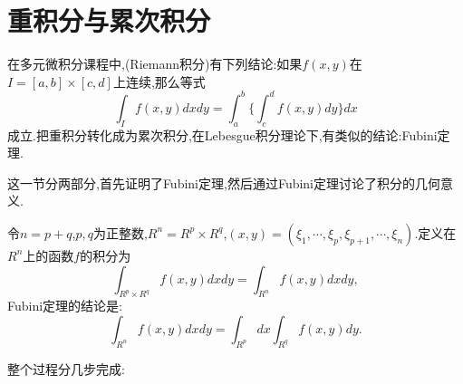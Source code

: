 \documentclass[12pt,a4paper,openany]{book}
\begin{document}
\section{重积分与累次积分}
在多元微积分课程中,(Riemann积分)有下列结论:如果$f(x,y)$在$I=[a,b]\times[c,d]$上连续,那么等式
\[
\int_{I}{f(x,y)dxdy} = \int_{a}^{b}{\{\int_{c}^{d}{f(x,y)dy}\}dx}
\]
成立.把重积分转化成为累次积分,在Lebesgue积分理论下,有类似的结论:Fubini定理.

这一节分两部分,首先证明了Fubini定理,然后通过Fubini定理讨论了积分的几何意义.

令$n=p+q$,$p,q$为正整数,$R^n=R^p \times R^q$,$(x,y)=(\xi_1,\cdots, \xi_p,\xi_{p+1}, \cdots,\xi_n)$.定义在$R^n$上的函数$f$的积分为
\[
\int_{R^p \times R^q}{f(x,y)dxdy} = \int_{R^n}{f(x,y)dxdy},
\]
Fubini定理的结论是:
\[
\int_{R^n}{f(x,y)dxdy} = \int_{R^p}{dx}\int_{R^q}{f(x,y)dy}.
\]

整个过程分几步完成:
\end{document}
